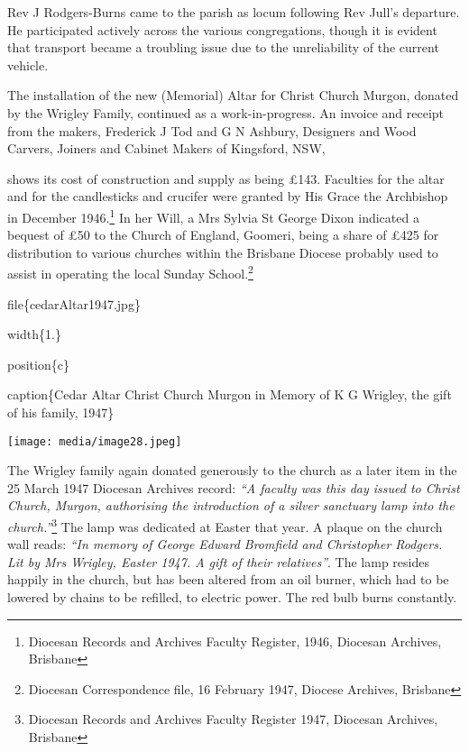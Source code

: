 Rev J Rodgers-Burns came to the parish as locum following Rev Jull's departure. He participated actively across the various congregations, though it is evident that transport became a troubling issue due to the unreliability of the current vehicle.

The installation of the new (Memorial) Altar for Christ Church Murgon, donated by the Wrigley Family, continued as a work-in-progress. An invoice and receipt from the makers, Frederick J Tod and G N Ashbury, Designers and Wood Carvers, Joiners and Cabinet Makers of Kingsford, NSW,

shows its cost of construction and supply as being £143. Faculties for the altar and for the candlesticks and crucifer were granted by His Grace the Archbishop in December 1946.\footnote{Diocesan Records and Archives Faculty Register, 1946, Diocesan Archives, Brisbane} In her Will, a Mrs Sylvia St George Dixon indicated a bequest of £50 to the Church of England, Goomeri, being a share of £425 for distribution to various churches within the Brisbane Diocese probably used to assist in operating the local Sunday School.\footnote{Diocesan Correspondence file, 16 February 1947, Diocese Archives, Brisbane}

file\{cedarAltar1947.jpg\}

width\{1.\}

position\{c\}

caption\{Cedar Altar Christ Church Murgon in Memory of K G Wrigley, the gift of his family, 1947\}

\texttt{[image: media/image28.jpeg]}

The Wrigley family again donated generously to the church as a later item in the 25 March 1947 Diocesan Archives record: \emph{``A faculty was this day issued to Christ Church, Murgon, authorising the introduction of a silver sanctuary lamp into the church.''}\footnote{Diocesan Records and Archives Faculty Register 1947, Diocesan Archives, Brisbane} The lamp was dedicated at Easter that year. A plaque on the church wall reads: \emph{``In memory of George Edward Bromfield and Christopher Rodgers. Lit by Mrs Wrigley, Easter 1947. A gift of their relatives''}. The lamp resides happily in the church, but has been altered from an oil burner, which had to be lowered by chains to be refilled, to electric power. The red bulb burns constantly.

